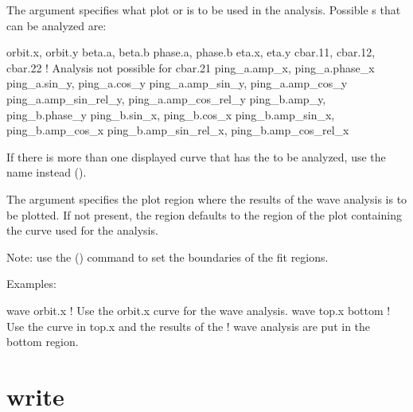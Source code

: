 {{{{{{{{{{{\vskip 7pt

The  argument specifies what plot  or  is to be
used in the analysis. Possible s that can be analyzed are:
\begin{example}
  orbit.x, orbit.y
  beta.a,  beta.b
  phase.a, phase.b
  eta.x, eta.y
  cbar.11, cbar.12, cbar.22      ! Analysis not possible for cbar.21
  ping_a.amp_x, ping_a.phase_x
  ping_a.sin_y, ping_a.cos_y
  ping_a.amp_sin_y, ping_a.amp_cos_y
  ping_a.amp_sin_rel_y, ping_a.amp_cos_rel_y
  ping_b.amp_y, ping_b.phase_y
  ping_b.sin_x, ping_b.cos_x
  ping_b.amp_sin_x, ping_b.amp_cos_x
  ping_b.amp_sin_rel_x, ping_b.amp_cos_rel_x
\end{example}
If there is more than one displayed curve that has the  to be analyzed, use the
 name instead ().

The  argument specifies the plot region where the results of the wave analysis
is to be plotted. If not present, the region defaults to the region of the plot containing the curve
used for the analysis.

Note: use the  () command to set the boundaries of the fit regions.

Examples:
\begin{example}
  wave orbit.x      ! Use the orbit.x curve for the wave analysis.
  wave top.x bottom ! Use the curve in top.x and the results of the 
                    !  wave analysis are put in the bottom region.
\end{example}


\section{write}
\label{s:write}

}}}}}}}}}}}

